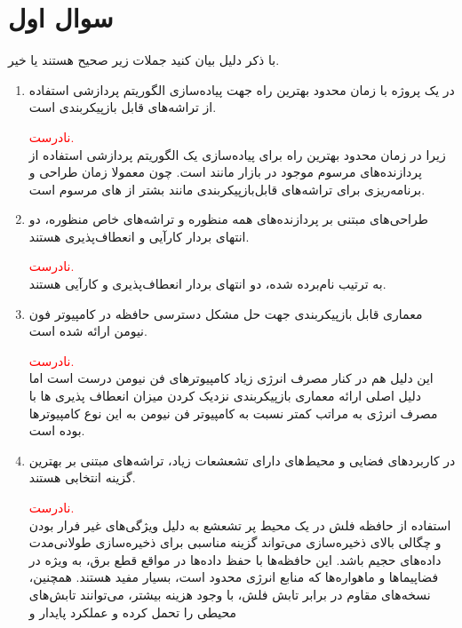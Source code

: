 \section{سوال اول}

با ذکر دلیل بیان کنید جملات زیر صحیح هستند یا خیر.

\begin{enumerate}
	\item 
	در یک پروژه با زمان محدود بهترین راه جهت پیاده‌سازی الگوریتم پردازشی استفاده از تراشه‌های قابل بازپیکربندی است.
	\begin{qsolve}
		\textcolor{red}{نادرست.}\\
		زیرا در زمان محدود بهترین راه برای پیاده‌سازی یک الگوریتم پردازشی استفاده از پردازنده‌های مرسوم موجود در بازار مانند  است. چون معمولا زمان طراحی و برنامه‌ریزی برای تراشه‌های قابل‌بازپیکربندی مانند  بشتر از  های مرسوم است.
	\end{qsolve}
	
	
	
	\item 
	طراحی‌های مبتنی بر پردازنده‌های همه منظوره و تراشه‌های خاص منظوره، دو انتهای بردار کارآیی و انعطاف‌پذیری هستند.
	\begin{qsolve}
		\textcolor{red}{نادرست.}\\
		به ترتیب نام‌برده شده، دو انتهای بردار انعطاف‌پذیری و کارآیی هستند.
	\end{qsolve}
	
	
	
	\item 
	معماری قابل بازپیکربندی جهت حل مشکل دسترسی حافظه در کامپیوتر فون نیومن ارائه شده است.
	\begin{qsolve}
		\textcolor{red}{نادرست.}\\
		این دلیل هم در کنار مصرف انرژی زیاد کامپیوتر‌های فن نیومن درست است اما دلیل اصلی ارائه معماری بازپیکربندی نزدیک کردن میزان انعطاف پذیری  ها با مصرف انرژی به مراتب کمتر نسبت به کامپیوتر فن نیومن به این نوع کامپیوترها بوده است.
	\end{qsolve}
	
	
	
	\item 
	در کاربردهای فضایی و محیط‌های دارای تشعشعات زیاد، تراشه‌های مبتنی بر  بهترین گزینه انتخابی هستند.
	\begin{qsolve}
		\textcolor{red}{نادرست.}\\
		استفاده از حافظه فلش در یک محیط پر تشعشع به دلیل ویژگی‌های غیر فرار بودن و چگالی بالای ذخیره‌سازی می‌تواند گزینه مناسبی برای ذخیره‌سازی طولانی‌مدت داده‌های حجیم باشد. این حافظه‌ها با حفظ داده‌ها در مواقع قطع برق، به ویژه در فضاپیماها و ماهواره‌ها که منابع انرژی محدود است، بسیار مفید هستند. همچنین، نسخه‌های مقاوم در برابر تابش فلش، با وجود هزینه بیشتر، می‌توانند تابش‌های محیطی را تحمل کرده و عملکرد پایدار و
		

\end{qsolve}
\end{enumerate}
